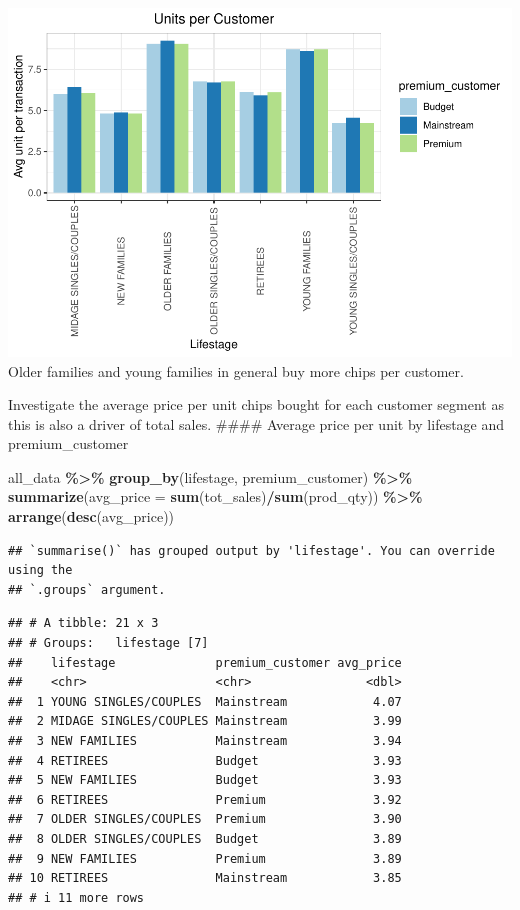 \documentclass[
]{article}
\newenvironment{Shaded}{\begin{snugshade}}{\end{snugshade}}
\newcommand{\AttributeTok}[1]{\textcolor[rgb]{0.13,0.29,0.53}{#1}}
\newcommand{\FunctionTok}[1]{\textcolor[rgb]{0.13,0.29,0.53}{\textbf{#1}}}
\newcommand{\NormalTok}[1]{#1}
\newcommand{\SpecialCharTok}[1]{\textcolor[rgb]{0.81,0.36,0.00}{\textbf{#1}}}
\begin{document}
\includegraphics{quantium_analysis_files/figure-latex/unnamed-chunk-33-1.pdf}
Older families and young families in general buy more chips per
customer.

Investigate the average price per unit chips bought for each customer
segment as this is also a driver of total sales. \#\#\#\# Average price
per unit by lifestage and premium\_customer

\begin{Shaded}
\begin{Highlighting}[]
\NormalTok{all\_data }\SpecialCharTok{\%\textgreater{}\%}
  \FunctionTok{group\_by}\NormalTok{(lifestage, premium\_customer) }\SpecialCharTok{\%\textgreater{}\%}
  \FunctionTok{summarize}\NormalTok{(}\AttributeTok{avg\_price =} \FunctionTok{sum}\NormalTok{(tot\_sales)}\SpecialCharTok{/}\FunctionTok{sum}\NormalTok{(prod\_qty)) }\SpecialCharTok{\%\textgreater{}\%}
  \FunctionTok{arrange}\NormalTok{(}\FunctionTok{desc}\NormalTok{(avg\_price))}
\end{Highlighting}
\end{Shaded}

\begin{verbatim}
## `summarise()` has grouped output by 'lifestage'. You can override using the
## `.groups` argument.
\end{verbatim}

\begin{verbatim}
## # A tibble: 21 x 3
## # Groups:   lifestage [7]
##    lifestage              premium_customer avg_price
##    <chr>                  <chr>                <dbl>
##  1 YOUNG SINGLES/COUPLES  Mainstream            4.07
##  2 MIDAGE SINGLES/COUPLES Mainstream            3.99
##  3 NEW FAMILIES           Mainstream            3.94
##  4 RETIREES               Budget                3.93
##  5 NEW FAMILIES           Budget                3.93
##  6 RETIREES               Premium               3.92
##  7 OLDER SINGLES/COUPLES  Premium               3.90
##  8 OLDER SINGLES/COUPLES  Budget                3.89
##  9 NEW FAMILIES           Premium               3.89
## 10 RETIREES               Mainstream            3.85
## # i 11 more rows
\end{verbatim}
\end{document}
